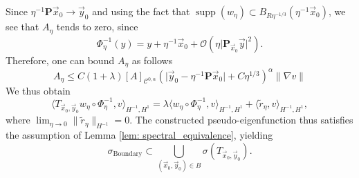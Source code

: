 \documentclass[a4paper,reqno]{amsart}
\numberwithin{equation}{section}
\numberwithin{equation}{section}		%
\numberwithin{figure}{section}			%
\numberwithin{table}{section}				%
\theoremstyle{definition}
\renewcommand{\tilde}{\widetilde}
\newcommand{\<}{\ensuremath \leq}
\renewcommand{\>}{\ensuremath \geq}
\renewcommand{\tilde}{\widetilde}
\begin{document}
Since $\eta^{-1}\textbf{P}\vec{x}_0\rightarrow\vec{y}_0$ and using the fact that $\operatorname{supp}(w_\eta)\subset B_{R\eta^{-1/3}}(\eta^{-1}\vec{x}_0)$, we see that $A_\eta$ tends to zero, since
\begin{equation}\label{eq:Boundary2}
    \Phi_\eta^{-1}(y) = y + \eta^{-1}\vec{x}_0 + \mathcal{O}(\eta\lvert \textbf{P}_{\vec{x}_0}\vec{y}\rvert^2).
\end{equation}
Therefore, one can bound $A_\eta$ as follows
\begin{equation}
    A_\eta \leq C(1+\lambda)[A]_{\mathcal{C}^{0,\alpha}} (\lvert \vec{y}_0-\eta^{-1}\textbf{P}\vec{x}_0\rvert + C\eta^{1/3})^\alpha\lVert \nabla v\rVert 
\end{equation}
We thus obtain
\begin{equation}
    \langle T_{\vec{x}_0,\vec{y}_0} w_\eta\circ\Phi_\eta^{-1}, v\rangle_{H^{-1},H^1}=\lambda\langle w_\eta\circ\Phi_\eta^{-1}, v\rangle_{H^{-1},H^1} +\langle \tilde{r}_\eta, v\rangle_{H^{-1},H^1},
\end{equation}
where $\lim_{\eta\rightarrow0}\lVert\tilde{r}_\eta\rVert_{H^{-1}}=0 $. The constructed pseudo-eigenfunction thus satisfies the assumption of Lemma \ref{lem: spectral_equivalence}, yielding
\begin{equation}
    \sigma_{\text{Boundary}} \subset \bigcup_{(\vec{x}_0,\vec{y}_0)\in B}\sigma(T_{\vec{x}_0,\vec{y}_0}).
\end{equation}
\end{document}
